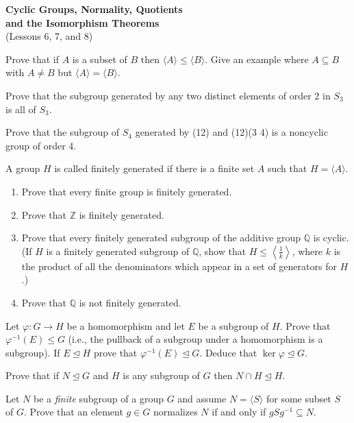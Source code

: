 \documentclass[
    11pt,a4paper,
]{exam}
\begin{document}
\def\contador{Problem Set 3}


\begin{center}
    {\bfseries\Large
        Cyclic Groups, Normality, Quotients  \\ and the Isomorphism Theorems}\\
    (Lessons 6, 7, and 8)
\end{center}


\begin{questions}
\question 
Prove that if $A$ is a subset of $B$ then $\langle A\rangle \leq\langle B\rangle$. Give an example where $A \subseteq B$ with $A \neq B$ but $\langle A\rangle=\langle B\rangle$.

\question
Prove that the subgroup generated by any two distinct elements of order 2 in $S_3$ is all of $S_3$.


\question 
Prove that the subgroup of $S_4$ generated by (12) and (12)(3 4) is a noncyclic group of order 4.


\question
A group $H$ is called finitely generated if there is a finite set $A$ such that $H=\langle A\rangle$.
\begin{enumerate}[label=(\roman*)]
    \item Prove that every finite group is finitely generated.
    \item Prove that $\mathbb{Z}$ is finitely generated.
    \item Prove that every finitely generated subgroup of the additive group $\mathbb{Q}$ is cyclic. (If $H$ is a finitely generated subgroup of $\mathbb{Q}$, show that $H \leq\left\langle\frac{1}{k}\right\rangle$, where $k$ is the product of all the denominators which appear in a set of generators for $H$.)
    \item Prove that $\mathbb{Q}$ is not finitely generated.
\end{enumerate}



\question
Let $\varphi: G \rightarrow H$ be a homomorphism and let $E$ be a subgroup of $H$. Prove that $\varphi^{-1}(E) \leq G$ (i.e., the pullback of a subgroup under a homomorphism is a subgroup). If $E \unlhd H$ prove that $\varphi^{-1}(E) \unlhd G$. Deduce that $\operatorname{ker} \varphi \unlhd G$.


\question
Prove that if $N \unlhd G$ and $H$ is any subgroup of $G$ then $N \cap H \unlhd H$.

\question 
Let $N$ be a \textit{finite} subgroup of a group $G$ and assume $N = \langle S \rangle$ for some subset $S$ of $G$. Prove that an element $g \in G$ normalizes $N$ if and only if $gSg^{-1} \subseteq N$.



\end{questions}
\end{document}
